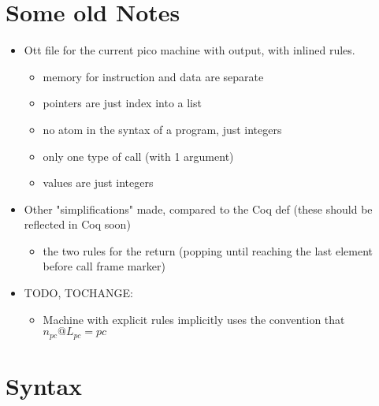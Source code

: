 \documentclass{article}
\begin{document}
\section*{Some old Notes}

\begin{itemize}
\item Ott file for the current pico machine with output, with inlined rules.
  \begin{itemize}
  \item memory for instruction and data are separate
  \item pointers are just index into a list
  \item no atom in the syntax of a program, just integers
  \item only one type of call (with 1 argument)
  \item values are just integers
  \end{itemize}
\item Other "simplifications" made, compared to the Coq def
  (these should be reflected in Coq soon)
  \begin{itemize}
    \item the two rules for the return (popping until reaching the
      last element before call frame marker)
  \end{itemize}
\item TODO, TOCHANGE: 
  \begin{itemize}
    \item Machine with explicit rules implicitly uses the convention that 
      $n_{pc}@L_{pc} = pc$
  \end{itemize}
\end{itemize}

\section*{Syntax}

\ottmetavars\\[3ex]

\ottgrammartabular{
\ottn\ottinterrule
\ottL\ottinterrule
\otta\ottinterrule
\ottinstr\ottinterrule
\ottS\ottinterrule
}

\end{document}
